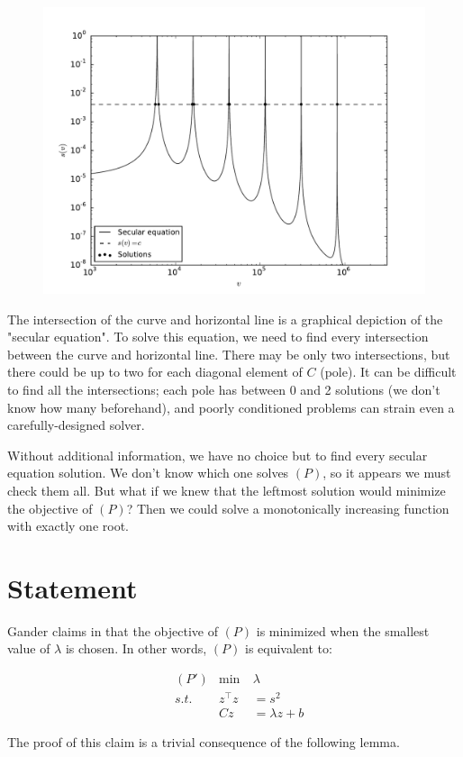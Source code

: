 \documentclass[10pt,letterpaper]{article}
\begin{document}
\begin{figure}[h!]
\centering
\includegraphics[width=0.7\linewidth]{images/secular}
\label{fig:secular}
\end{figure}


The intersection of the curve and horizontal line is a graphical depiction of the "secular equation". To solve this equation, we need to find every intersection between the curve and horizontal line. There may be only two intersections, but there could be up to two for each diagonal element of $C$ (pole). It can be difficult to find all the intersections; each pole has between 0 and 2 solutions (we don't know how many beforehand), and poorly conditioned problems can strain even a carefully-designed solver.

Without additional information, we have no choice but to find every secular equation solution. We don't know which one solves $(P)$, so it appears we must check them all. But what if we knew that the leftmost solution would minimize the objective of $(P)$? Then we could solve a monotonically increasing function with exactly one root.

\section*{Statement}
Gander claims in \cite{gander1989} that the objective of $(P)$ is minimized when the smallest value of $\lambda$ is chosen. In other words, $(P)$ is equivalent to:


\begin{align*}
&(P') & \min~ & \lambda  \\
& s.t.& z^\top z &= s^2 \\
&& Cz &= \lambda z + b
\end{align*}


The proof of this claim is a trivial consequence of the following lemma.
\end{document}
